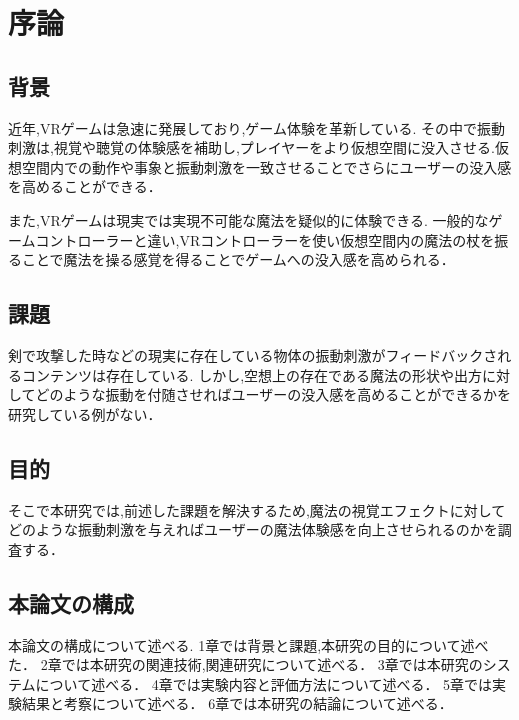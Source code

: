 \chapter{序論}
\section{背景}
近年,VRゲームは急速に発展しており,ゲーム体験を革新している.
その中で振動刺激は,視覚や聴覚の体験感を補助し,プレイヤーをより仮想空間に没入させる.仮想空間内での動作や事象と振動刺激を一致させることでさらにユーザーの没入感を高めることができる．

また,VRゲームは現実では実現不可能な魔法を疑似的に体験できる.
一般的なゲームコントローラーと違い,VRコントローラーを使い仮想空間内の魔法の杖を振ることで魔法を操る感覚を得ることでゲームへの没入感を高められる．

\section{課題}
剣で攻撃した時などの現実に存在している物体の振動刺激がフィードバックされるコンテンツは存在している.
しかし,空想上の存在である魔法の形状や出方に対してどのような振動を付随させればユーザーの没入感を高めることができるかを研究している例がない．
\section{目的}
そこで本研究では,前述した課題を解決するため,魔法の視覚エフェクトに対してどのような振動刺激を与えればユーザーの魔法体験感を向上させられるのかを調査する．

\section{本論文の構成}
本論文の構成について述べる.
1章では背景と課題,本研究の目的について述べた．
2章では本研究の関連技術,関連研究について述べる．
3章では本研究のシステムについて述べる．
4章では実験内容と評価方法について述べる．
5章では実験結果と考察について述べる．
6章では本研究の結論について述べる．
